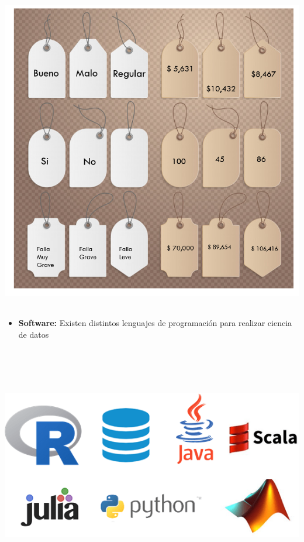\documentclass[
]{book}
\providecommand{\tightlist}{%
  \setlength{\itemsep}{0pt}\setlength{\parskip}{0pt}}
\begin{document}
\begin{center}\includegraphics[width=600pt,height=400pt]{img/01-intro2ds/12_etiquetas} \end{center}

\begin{itemize}
\tightlist
\item
  \textbf{Software:} Existen distintos lenguajes de programación para realizar ciencia de datos
\end{itemize}

\begin{center}\includegraphics[width=600pt,height=300pt]{img/01-intro2ds/13_lenguajes} \end{center}
\end{document}
